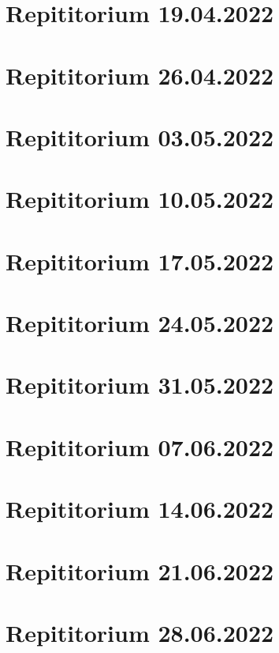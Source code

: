 \documentclass[a4paper,12pt]{article}
\begin{document}
\tableofcontents
\newpage
\section{Repititorium 19.04.2022}

\newpage
\section{Repititorium 26.04.2022}

\newpage
\section{Repititorium 03.05.2022}

\newpage
\section{Repititorium 10.05.2022}

\newpage
\section{Repititorium 17.05.2022}

\newpage
\section{Repititorium 24.05.2022}

\newpage
\section{Repititorium 31.05.2022}

\newpage
\section{Repititorium 07.06.2022}

\newpage
\section{Repititorium 14.06.2022}

\newpage
\section{Repititorium 21.06.2022}

\newpage
\section{Repititorium 28.06.2022}

\end{document}
